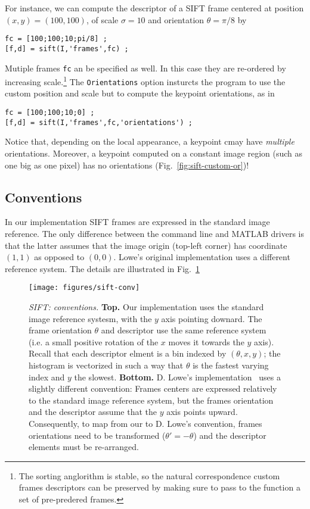 \documentclass[9pt]{article}
\newcommand{\param}[1]{{\color{red}\tt   #1}}
\begin{document}
For instance, we can compute the descriptor of a SIFT frame centered
at position $(x,y)=(100,100)$, of scale $\sigma=10$ and orientation
$\theta=\pi/8$ by
\begin{verbatim}
fc = [100;100;10;pi/8] ;
[f,d] = sift(I,'frames',fc) ;
\end{verbatim}
Mutiple frames \verb$fc$ an be specified as well. In this case they
are re-ordered by increasing scale.\footnote{The sorting anglorithm is
  stable, so the natural correspondence custom frames descriptors can
  be preserved by making sure to pass to the function a set of
  pre-predered frames.} The \param{Orientations} option insturcts the
program to use the custom position and scale but to compute the
keypoint orientations, as in
\begin{verbatim}
fc = [100;100;10;0] ;
[f,d] = sift(I,'frames',fc,'orientations') ;
\end{verbatim}
Notice that, depending on the local appearance, a keypoint cmay have
{\em multiple} orientations.  Moreover, a keypoint computed on a
constant image region (such as one big as one pixel) has no
orientations (Fig.~\ref{fig:sift-custom-or})!

\subsection{Conventions}\label{sift.conventions}

In our implementation SIFT frames are expressed in the standard image
reference.  The only difference between the command line and MATLAB
drivers is that the latter assumes that the image origin (top-left
corner) has coordinate $(1,1)$ as opposed to $(0,0)$. Lowe's original
implementation uses a different reference system. The details are
illustrated in Fig.~\ref{fig:sift-conv}

\begin{figure}
\begin{center}
\texttt{[image: figures/sift-conv]}
\end{center}
\caption{{\em SIFT: conventions.} {\bf Top.} Our implementation uses
  the standard image reference systesm, with the $y$ axis pointing
  downard. The frame orientation $\theta$ and descriptor use the same
  reference system (i.e. a small positive rotation of the $x$ moves it
  towards the $y$ axis). Recall that each descriptor elment is a bin
  indexed by $(\theta,x,y)$; the histogram is vectorized in such a way
  that $\theta$ is the fastest varying index and $y$ the slowest. {\bf
    Bottom.} D. Lowe's implementation~\cite{lowe07sift} uses a
  slightly different convention: Frames centers are expressed
  relatively to the standard image reference system, but the frames
  orientation and the descriptor assume that the $y$ axis points
  upward. Consequently, to map from our to D. Lowe's convention,
  frames orientations need to be transformed ($\theta'=-\theta$) and
  the descriptor elements must be re-arranged.}
\label{fig:sift-conv}
\end{figure}
\end{document}
